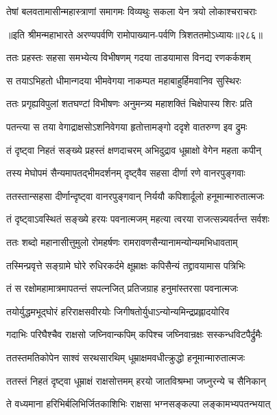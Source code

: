 \twolineshloka
{तेषां बलवतामासीन्महास्त्राणां समागमः}
{विव्यथुः सकला येन त्रयो लोकाश्चराचराः}


॥इति श्रीमन्महाभारते अरण्यपर्वणि रामोपाख्यान-पर्वणि त्रिशततमोऽध्यायः॥२८६॥

\storymeta

\resetShloka



\twolineshloka
{ततः प्रहस्तः सहसा समभ्येत्य विभीषणम्}
{गदया ताडयामास विनद्य रणकर्कशम्}


\twolineshloka
{स तयाऽभिहतो धीमान्गदया भीमवेगया}
{नाकम्पत महाबाहुर्हिमवानिव सुस्थिरः}


\twolineshloka
{ततः प्रगृह्यविपुलां शतघण्टां विभीषणः}
{अनुमन्त्र्य महाशक्तिं चिक्षेपास्य शिरः प्रति}


\twolineshloka
{पतन्त्या स तया वेगाद्राक्षसोऽशनिवेगया}
{हृतोत्तामङ्गो ददृशे वातरुग्ण इव द्रुमः}


\twolineshloka
{तं दृष्ट्वा निहतं सङ्ख्ये प्रहस्तं क्षणदाचरम्}
{अभिदुद्राव धूम्राक्षो वेगेन महता कपीन्}


\twolineshloka
{तस्य मेघोपमं सैन्यमापतद्भीमदर्शनम्}
{दृष्ट्वैव सहसा दीर्णा रणे वानरपुङ्गवाः}


\twolineshloka
{ततस्तान्सहसा दीर्णान्दृष्ट्वा वानरपुङ्गवान्}
{निर्ययौ कपिशार्दूलो हनूमान्मारुतात्मजः}


\twolineshloka
{तं दृष्ट्वाऽवस्थितं सङ्ख्ये हरयः पवनात्मजम्}
{महत्या त्वरया राजत्सन्न्यवर्तन्त सर्वशः}


\twolineshloka
{ततः शब्दो महानासीत्तुमुलो रोमहर्षणः}
{रामरावणसैन्यानामन्योन्यमभिधावताम्}


\twolineshloka
{तस्मिन्प्रवृत्ते सङ्ग्रामे घोरे रुधिरकर्दमे}
{क्षूम्राक्षः कपिसैन्यं तद्द्रावयामास पत्रिभिः}


\twolineshloka
{तं स रक्षोमहामात्रमापतन्तं सपत्नजित्}
{प्रतिजग्राह हनुमांस्तरसा पवनात्मजः}


\twolineshloka
{तयोर्युद्धमभूद्घोरं हरिराक्षसवीरयोः}
{जिगीषतोर्युधाऽन्योन्यमिन्द्रप्रह्लादयोरिव}


\twolineshloka
{गदाभिः परिघैश्चैव राक्षसो जघ्निवान्कपिम्}
{कपिश्च जघ्निवान्रक्षः सस्कन्धविटपैर्द्रुमैः}


\twolineshloka
{ततस्तमतिकोपेन साश्वं सरथसारथिम्}
{धूम्राक्षमवधीत्क्रुद्धो हनूमान्मारुतात्मजः}


\twolineshloka
{ततस्तं निहतं दृष्ट्वा धूम्राक्षं राक्षसोत्तमम्}
{हरयो जातविश्रम्भा जघ्नुरन्ये च सैनिकान्}


\twolineshloka
{ते वध्यमाना हरिभिर्बलिभिर्जितकाशिभिः}
{राक्षसा भग्नसङ्कल्पा लङ्कामभ्यपतन्भयात्}


